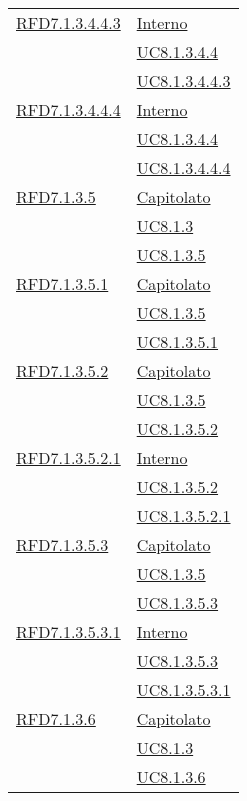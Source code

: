 \begin{longtable}{|>{\centering}m{5cm}|m{5cm}<{\centering}|}
\hyperlink{RFD7.1.3.4.4.3}{RFD7.1.3.4.4.3} & \hyperlink{Interno}{Interno}\\
& \hyperref[UC8.1.3.4.4]{UC8.1.3.4.4}\\
& \hyperref[UC8.1.3.4.4.3]{UC8.1.3.4.4.3}\\ \hline

\hyperlink{RFD7.1.3.4.4.4}{RFD7.1.3.4.4.4} & \hyperlink{Interno}{Interno}\\
& \hyperref[UC8.1.3.4.4]{UC8.1.3.4.4}\\
& \hyperref[UC8.1.3.4.4.4]{UC8.1.3.4.4.4}\\ \hline

\hyperlink{RFD7.1.3.5}{RFD7.1.3.5} & \hyperlink{Capitolato}{Capitolato}\\
& \hyperref[UC8.1.3]{UC8.1.3}\\
& \hyperref[UC8.1.3.5]{UC8.1.3.5}\\ \hline

\hyperlink{RFD7.1.3.5.1}{RFD7.1.3.5.1} & \hyperlink{Capitolato}{Capitolato}\\
& \hyperref[UC8.1.3.5]{UC8.1.3.5}\\
& \hyperref[UC8.1.3.5.1]{UC8.1.3.5.1}\\ \hline

\hyperlink{RFD7.1.3.5.2}{RFD7.1.3.5.2} & \hyperlink{Capitolato}{Capitolato}\\
& \hyperref[UC8.1.3.5]{UC8.1.3.5}\\
& \hyperref[UC8.1.3.5.2]{UC8.1.3.5.2}\\ \hline

\hyperlink{RFD7.1.3.5.2.1}{RFD7.1.3.5.2.1} & \hyperlink{Interno}{Interno}\\
& \hyperref[UC8.1.3.5.2]{UC8.1.3.5.2}\\
& \hyperref[UC8.1.3.5.2.1]{UC8.1.3.5.2.1}\\ \hline

\hyperlink{RFD7.1.3.5.3}{RFD7.1.3.5.3} & \hyperlink{Capitolato}{Capitolato}\\
& \hyperref[UC8.1.3.5]{UC8.1.3.5}\\
& \hyperref[UC8.1.3.5.3]{UC8.1.3.5.3}\\ \hline

\hyperlink{RFD7.1.3.5.3.1}{RFD7.1.3.5.3.1} & \hyperlink{Interno}{Interno}\\
& \hyperref[UC8.1.3.5.3]{UC8.1.3.5.3}\\
& \hyperref[UC8.1.3.5.3.1]{UC8.1.3.5.3.1}\\ \hline

\hyperlink{RFD7.1.3.6}{RFD7.1.3.6} & \hyperlink{Capitolato}{Capitolato}\\
& \hyperref[UC8.1.3]{UC8.1.3}\\
& \hyperref[UC8.1.3.6]{UC8.1.3.6}\\ \hline


\end{longtable}
